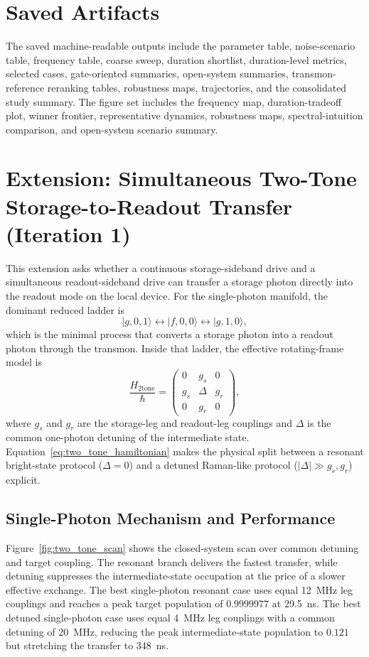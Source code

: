 \documentclass[11pt]{article}
\begin{document}
\section{Saved Artifacts}
The saved machine-readable outputs include the parameter table, noise-scenario table, frequency table, coarse sweep, duration shortlist, duration-level metrics, selected cases, gate-oriented summaries, open-system summaries, transmon-reference reranking tables, robustness maps, trajectories, and the consolidated study summary. The figure set includes the frequency map, duration-tradeoff plot, winner frontier, representative dynamics, robustness maps, spectral-intuition comparison, and open-system scenario summary.

\clearpage
\section{Extension: Simultaneous Two-Tone Storage-to-Readout Transfer (Iteration 1)}
\label{sec:two_tone_extension}
This extension asks whether a continuous storage-sideband drive and a simultaneous readout-sideband drive can transfer a storage photon directly into the readout mode on the local device. For the single-photon manifold, the dominant reduced ladder is
\begin{equation}
|g,0,1\rangle \leftrightarrow |f,0,0\rangle \leftrightarrow |g,1,0\rangle,
\label{eq:two_tone_ladder}
\end{equation}
which is the minimal process that converts a storage photon into a readout photon through the transmon. Inside that ladder, the effective rotating-frame model is
\begin{equation}
\frac{H_{\mathrm{2tone}}}{\hbar} =
\begin{pmatrix}
0 & g_s & 0 \\
g_s & \Delta & g_r \\
0 & g_r & 0
\end{pmatrix},
\label{eq:two_tone_hamiltonian}
\end{equation}
where $g_s$ and $g_r$ are the storage-leg and readout-leg couplings and $\Delta$ is the common one-photon detuning of the intermediate state. Equation~\eqref{eq:two_tone_hamiltonian} makes the physical split between a resonant bright-state protocol ($\Delta=0$) and a detuned Raman-like protocol ($|\Delta| \gg g_s,g_r$) explicit.

\subsection{Single-Photon Mechanism and Performance}
Figure~\ref{fig:two_tone_scan} shows the closed-system scan over common detuning and target coupling. The resonant branch delivers the fastest transfer, while detuning suppresses the intermediate-state occupation at the price of a slower effective exchange. The best single-photon resonant case uses equal \SI{12}{MHz} leg couplings and reaches a peak target population of $0.9999977$ at \SI{29.5}{ns}. The best detuned single-photon case uses equal \SI{4}{MHz} leg couplings with a common detuning of \SI{20}{MHz}, reducing the peak intermediate-state population to $0.121$ but stretching the transfer to \SI{348}{ns}.
\end{document}
